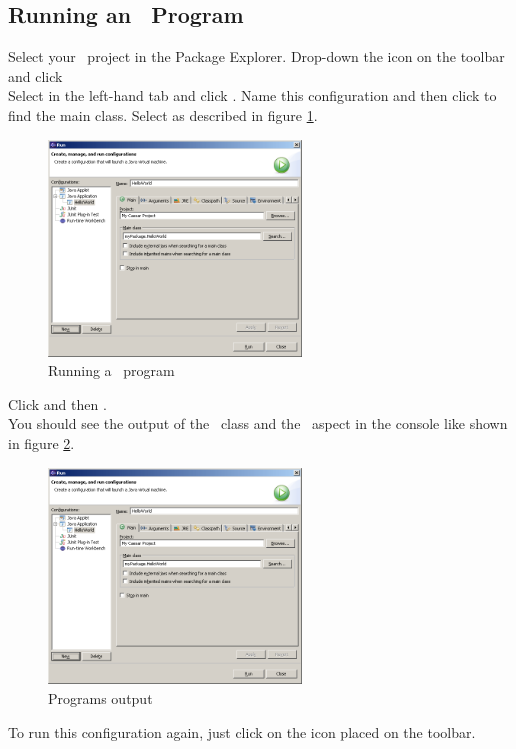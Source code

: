 \subsection{Running an \caesarj ~Program}
Select your \caesarj ~project in the Package Explorer. Drop-down the  icon on the toolbar and click \\
Select  in the left-hand tab and click .
Name this configuration  and then click  to find the main class. Select  as described in figure \ref{fig:run}.

\begin{figure}[htbp]
	\centering
		\includegraphics[width=0.60\textwidth]{images/run.png}
	\caption{Running a \caesarj ~program}
	\label{fig:run}
\end{figure}

Click  and then .\\
You should see the output of the  ~class and the  ~aspect in the console like shown in figure \ref{fig:console}.

\begin{figure}[htbp]
	\centering
		\includegraphics[width=0.60\textwidth]{images/run.png}
	\caption{Programs output}
	\label{fig:console}
\end{figure}
To run this configuration again, just click on the  icon placed on the toolbar.
